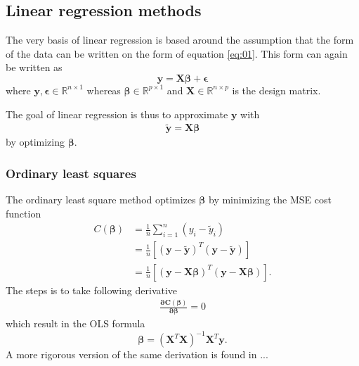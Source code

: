 \documentclass[uio,jmp,amsmath,amssymb,reprint]{revtex4-1}
\numberwithin{equation}{section}
\newcommand{\lp}{\left(}
\newcommand{\rp}{\right)}
\newcommand{\lsb}{\left[}
\newcommand{\rsb}{\right]}
\begin{document}
\subsection{Linear regression methods}

The very basis of linear regression is based around the assumption that the form of the data can be written on the form of equation \ref{eq:01}. This form can again be written as
\begin{equation}
    \bm{y} = \bm{X}\bm{\beta} + \bm{\epsilon}
\end{equation}
where \(\bm{y}, \bm{\epsilon} \in \mathbb{R}^{n\times 1}\) whereas \(\bm{\beta} \in \mathbb{R}^{p\times 1}\) and \(\bm{X}  \in \mathbb{R}^{n\times p}\) is the design matrix.

The goal of linear regression is thus to approximate \(\bm{y}\) with
\begin{align}
    \bm{\tilde{y}} = \bm{X}\bm{\beta}
\end{align}
by optimizing \(\bm{\beta}\). 

\subsubsection{Ordinary least squares}

The ordinary least square method optimizes \(\bm{\beta}\) by minimizing the MSE cost function
\begin{align}
    C(\bm{\beta}) &= \frac{1}{n}\sum_{i=1}^n(y_i-\tilde{y}_i)\\
    &= \frac{1}{n}\lsb \lp \bm{y} - \bm{\tilde{y}}\rp^T\lp \bm{y} - \bm{\tilde{y}}\rp\rsb\\
    &= \frac{1}{n}\lsb \lp \bm{y} - \bm{X}\bm{\beta}\rp^T\lp \bm{y} - \bm{X}\bm{\beta}\rp\rsb.
\end{align}
The steps is to take following derivative
\begin{align}
    \bm{\frac{\partial C(\beta)}{\partial\beta}} = 0
\end{align}
which result in the OLS formula
\begin{equation}\label{eq:06}
    \bm{\beta} = (\bm{X}^T\bm{X})^{-1}\bm{X}^T\bm{y}.
\end{equation}
A more rigorous version of the same derivation is found in ...
\end{document}
